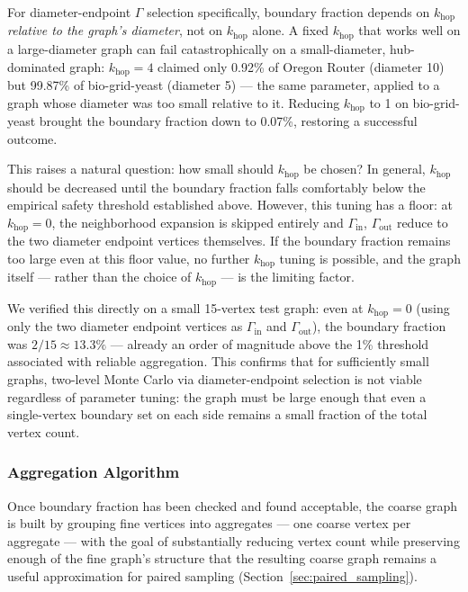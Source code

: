 \documentclass[a4paper,12pt]{amsart}
\numberwithin{equation}{section}
\begin{document}
For diameter-endpoint $\Gamma$ selection specifically, boundary 
fraction depends on $k_{\text{hop}}$ \emph{relative to the graph's 
diameter}, not on $k_{\text{hop}}$ alone. A fixed $k_{\text{hop}}$ that 
works well on a large-diameter graph can fail catastrophically on a 
small-diameter, hub-dominated graph: $k_{\text{hop}}=4$ claimed only 
0.92\% of Oregon Router (diameter 10) but 99.87\% of bio-grid-yeast 
(diameter 5) — the same parameter, applied to a graph whose diameter 
was too small relative to it. Reducing $k_{\text{hop}}$ to 1 on 
bio-grid-yeast brought the boundary fraction down to 0.07\%, restoring 
a successful outcome.

This raises a natural question: how small should $k_{\text{hop}}$ be 
chosen? In general, $k_{\text{hop}}$ should be decreased until the 
boundary fraction falls comfortably below the empirical safety 
threshold established above. However, this tuning has a floor: at 
$k_{\text{hop}} = 0$, the neighborhood expansion is skipped entirely 
and $\Gamma_{\text{in}}$, $\Gamma_{\text{out}}$ reduce to the two 
diameter endpoint vertices themselves. If the boundary fraction 
remains too large even at this floor value, no further $k_{\text{hop}}$ 
tuning is possible, and the graph itself — rather than the choice of 
$k_{\text{hop}}$ — is the limiting factor.

We verified this directly on a small 15-vertex test graph: even at 
$k_{\text{hop}} = 0$ (using only the two diameter endpoint vertices as 
$\Gamma_{\text{in}}$ and $\Gamma_{\text{out}}$), the boundary fraction 
was $2/15 \approx 13.3\%$ — already an order of magnitude above the 
1\% threshold associated with reliable aggregation. This confirms that 
for sufficiently small graphs, two-level Monte Carlo via 
diameter-endpoint selection is not viable regardless of parameter 
tuning: the graph must be large enough that even a single-vertex 
boundary set on each side remains a small fraction of the total vertex 
count.

\subsubsection{Aggregation Algorithm}
\label{sec:aggregation}

Once boundary fraction has been checked and found acceptable, the 
coarse graph is built by grouping fine vertices into aggregates — one 
coarse vertex per aggregate — with the goal of substantially reducing 
vertex count while preserving enough of the fine graph's structure 
that the resulting coarse graph remains a useful approximation for 
paired sampling (Section~\ref{sec:paired_sampling}).
\end{document}
